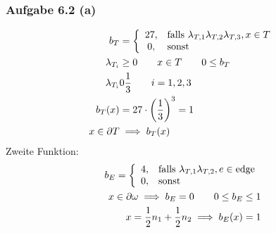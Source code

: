 \subsubsection{Aufgabe 6.2 (a)}
\begin{align*}
	b_T&=\left\lbrace\begin{array}{cl}
		27, &\text{falls } \lambda_{T,1}\lambda_{T,2}\lambda_{T,3},x\in T\\
		0, &\text{sonst }
	\end{array}\right.\\
	\lambda_{T_i}&\geq 0\qquad x\in T\qquad 0\leq b_T\\
	\lambda_{T_i}&0\frac{1}{3}\qquad i=1,2,3\\
	b_T(x)&=27\cdot\left(\frac{1}{3}\right)^3=1\\
	x\in\partial T&\implies b_T(x)
\end{align*}
Zweite Funktion:
\begin{align*}
	b_E=\left\lbrace\begin{array}{cl}
		4, &\text{falls }\lambda_{T,1}\lambda_{T,2},e\in\text{edge}\\
		0, &\text{sonst }
	\end{array}\right.\\
	x\in\partial\omega\implies b_E=0\qquad 0\leq b_E\leq 1\\
	x=\frac{1}{2}n_1+\frac{1}{2}n_2\implies b_E(x)=1
\end{align*}




